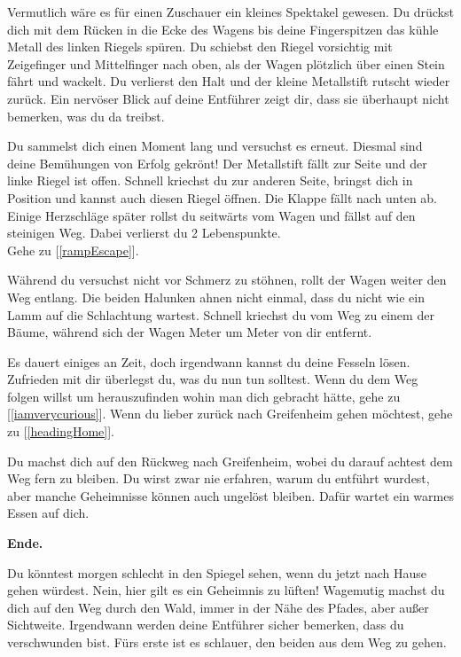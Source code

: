 
Vermutlich wäre es für einen Zuschauer ein kleines Spektakel gewesen. Du drückst dich mit dem Rücken in die Ecke des Wagens bis deine Fingerspitzen das kühle Metall des linken Riegels spüren. Du schiebst den Riegel vorsichtig mit Zeigefinger und Mittelfinger nach oben, als der Wagen plötzlich über einen Stein fährt und wackelt. Du verlierst den Halt und der kleine Metallstift rutscht wieder zurück. Ein nervöser Blick auf deine Entführer zeigt dir, dass sie überhaupt nicht bemerken, was du da treibst.

Du sammelst dich einen Moment lang und versuchst es erneut. Diesmal sind deine Bemühungen von Erfolg gekrönt! Der Metallstift fällt zur Seite und der linke Riegel ist offen. Schnell kriechst du zur anderen Seite, bringst dich in Position und kannst auch diesen Riegel öffnen. Die Klappe fällt nach unten ab. Einige Herzschläge später rollst du seitwärts vom Wagen und fällst auf den steinigen Weg. Dabei verlierst du 2 Lebenspunkte.
\\Gehe zu [\ref{rampEscape}].


Während du versuchst nicht vor Schmerz zu stöhnen, rollt der Wagen weiter den Weg entlang. Die beiden Halunken ahnen nicht einmal, dass du nicht wie ein Lamm auf die Schlachtung wartest. Schnell kriechst du vom Weg zu einem der Bäume, während sich der Wagen Meter um Meter von dir entfernt.

Es dauert einiges an Zeit, doch irgendwann kannst du deine Fesseln lösen. Zufrieden mit dir überlegst du, was du nun tun solltest. Wenn du dem Weg folgen willst um herauszufinden wohin man dich gebracht hätte, gehe zu [\ref{iamverycurious}]. Wenn du lieber zurück nach Greifenheim gehen möchtest, gehe zu [\ref{headingHome}].


Du machst dich auf den Rückweg nach Greifenheim, wobei du darauf achtest dem Weg fern zu bleiben.
Du wirst zwar nie erfahren, warum du entführt wurdest, aber manche Geheimnisse können auch ungelöst bleiben. Dafür wartet ein warmes Essen auf dich.

\textbf{Ende.}


Du könntest morgen schlecht in den Spiegel sehen, wenn du jetzt nach Hause gehen würdest. Nein, hier gilt es ein Geheimnis zu lüften! Wagemutig machst du dich auf den Weg durch den Wald, immer in der Nähe des Pfades, aber außer Sichtweite. Irgendwann werden deine Entführer sicher bemerken, dass du verschwunden bist. Fürs erste ist es schlauer, den beiden aus dem Weg zu gehen.

